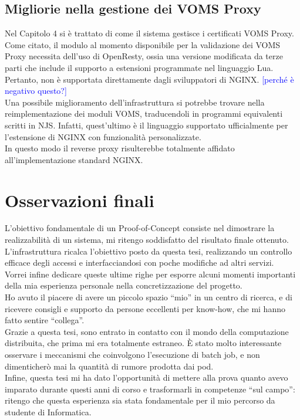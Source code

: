 \subsection{Migliorie nella gestione dei VOMS Proxy}
Nel Capitolo 4 si è trattato di come il sistema gestisce i certificati VOMS Proxy. 
Come citato, il modulo al momento disponibile per la validazione dei VOMS Proxy necessita dell'uso di OpenResty, 
ossia una versione modificata da terze 
parti che include il supporto a estensioni programmate nel linguaggio Lua. Pertanto, non è supportata direttamente dagli sviluppatori di NGINX. 
\textcolor{blue}{[perché è negativo questo?]}
\\  Una possibile miglioramento dell'infrastruttura si potrebbe trovare nella reimplementazione dei moduli VOMS, 
traducendoli in programmi equivalenti scritti in NJS. Infatti, quest'ultimo è il linguaggio supportato ufficialmente per 
l'estensione di NGINX con funzionalità personalizzate.  
\\ In questo modo il reverse proxy 
risulterebbe totalmente affidato all'implementazione standard NGINX.

\section{Osservazioni finali}
L'obiettivo fondamentale di un Proof-of-Concept consiste nel dimostrare la realizzabilità 
di un sistema, mi ritengo soddisfatto del risultato finale ottenuto. L'infrastruttura ricalca l'obiettivo 
posto da questa tesi, realizzando un controllo efficace degli accessi e interfacciandosi 
con poche modifiche ad altri servizi.  
\\Vorrei infine dedicare queste ultime righe per esporre alcuni momenti importanti della mia esperienza personale nella concretizzazione del progetto. 
\\ Ho avuto il piacere di avere un piccolo spazio “mio” in un centro di ricerca, e di ricevere consigli e supporto da persone eccellenti per know-how, che mi hanno fatto sentire “collega”.
\\ Grazie a questa tesi, sono entrato in contatto con il mondo della computazione distribuita, che prima mi era totalmente estraneo. 
È stato molto interessante osservare i meccanismi che coinvolgono l'esecuzione di batch job, e non dimenticherò mai 
la quantità di rumore prodotta dai pod.   
\\ Infine, questa tesi mi ha dato l'opportunità di mettere alla prova quanto avevo
imparato durante questi anni di corso e trasformarli in competenze “sul campo”:
 ritengo che questa esperienza sia stata fondamentale per il mio percorso da studente di Informatica.  